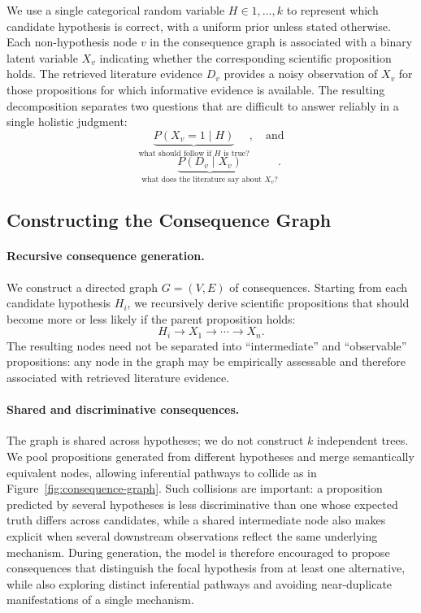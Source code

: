\documentclass[twoside]{article}
\begin{document}
We use a single categorical random variable
$H\in{1,\ldots,k}$ to represent which candidate hypothesis is correct, with a
uniform prior unless stated otherwise. Each non-hypothesis node $v$ in the
consequence graph is associated with a binary latent variable $X_v$ indicating
whether the corresponding scientific proposition holds. The retrieved
literature evidence $D_v$ provides a noisy observation of $X_v$ for those
propositions for which informative evidence is available. The resulting
decomposition separates two questions that are difficult to answer reliably in
a single holistic judgment:
\begin{equation} 
\underbrace{P(X_v=1\mid H)}_{\text{what should follow if $H$ is true?}}, \quad \text{and} 
\end{equation} 
\begin{equation} 
\underbrace{P(D_v\mid X_v)}_{\text{what does the literature say about $X_v$?}}. \end{equation}

\subsection{Constructing the Consequence Graph}
\label{sec:graph-construction}

\paragraph{Recursive consequence generation.}
We construct a directed graph $G=(V,E)$ of consequences. Starting from each candidate hypothesis $H_i$, we recursively derive scientific propositions that should become more or less likely if the parent proposition holds:
\begin{equation}
H_i \rightarrow X_1 \rightarrow \cdots \rightarrow X_n.    
\end{equation}
The resulting nodes need not be separated into ``intermediate'' and ``observable'' propositions: any node in the graph may be empirically assessable and therefore associated with retrieved literature evidence.

\paragraph{Shared and discriminative consequences.}
The graph is shared across hypotheses; we do not construct $k$
independent trees. We pool propositions generated from different hypotheses
and merge semantically equivalent nodes, allowing inferential pathways to
collide as in Figure~\ref{fig:consequence-graph}. Such collisions are important:
a proposition predicted by several hypotheses is less discriminative than one
whose expected truth differs across candidates, while a shared intermediate
node also makes explicit when several downstream observations reflect the same
underlying mechanism. During generation, the model is therefore encouraged to
propose consequences that distinguish the focal hypothesis from at least one
alternative, while also exploring distinct inferential pathways and avoiding
near-duplicate manifestations of a single mechanism.
\end{document}
